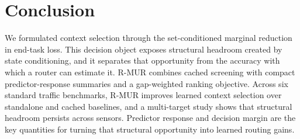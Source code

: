 \section{Conclusion}

We formulated context selection through the set-conditioned marginal reduction
in end-task loss. This decision object exposes structural headroom created by
state conditioning, and it separates that opportunity from the accuracy with
which a router can estimate it. R-MUR combines cached screening with compact
predictor-response summaries and a gap-weighted ranking objective. Across six
standard traffic benchmarks, R-MUR improves learned context selection over
standalone and cached baselines, and a multi-target study shows that structural
headroom persists across sensors. Predictor response and decision margin are
the key quantities for turning that structural opportunity into learned
routing gains.

